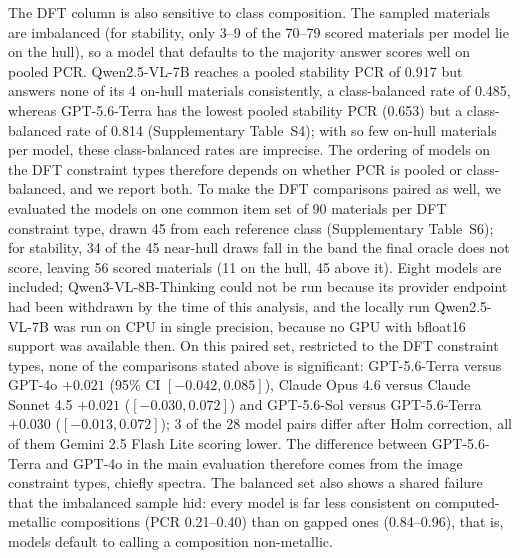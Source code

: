 \documentclass[pdflatex,sn-nature]{sn-jnl}
\newcommand{\rev}[1]{#1} %
\newcommand{\rev}[1]{{\color{blue}#1}} %
\providecommand{\DIFadd}[1]{{\protect\color{blue} \sf #1}} %
\providecommand{\DIFaddbegin}{} %
\providecommand{\DIFaddincludegraphics}[2][]{{\color{blue}\fbox{\DIFOincludegraphics[#1]{#2}}}} %
\DeclareRobustCommand{\DIFaddbegin}{\DIFOaddbegin \let\includegraphics\DIFaddincludegraphics} %
\begin{document}
\DIFaddbegin \DIFadd{\rev{The DFT column is also sensitive to class composition. The sampled materials are
imbalanced (for stability, only 3--9 of the 70--79 scored materials per model lie on the hull), so a
model that defaults to the majority answer scores well on pooled PCR. Qwen2.5-VL-7B reaches a pooled
stability PCR of 0.917 but answers none of its 4 on-hull materials consistently, a class-balanced rate
of 0.485, whereas GPT-5.6-Terra has the lowest pooled stability PCR (0.653) but a class-balanced rate of
0.814 (Supplementary Table~S4); with so few on-hull materials per model, these class-balanced rates are
imprecise. The ordering of models on the DFT constraint types therefore depends on whether PCR is pooled
or class-balanced, and we report both. To make the DFT comparisons paired as well, we evaluated the
models on one common item set of 90 materials per DFT constraint type, drawn 45 from each reference
class (Supplementary Table~S6); for stability, 34 of the 45 near-hull draws fall in the band the final
oracle does not score, leaving 56 scored materials (11 on the hull, 45 above it). Eight models are
included; Qwen3-VL-8B-Thinking could not be run because its provider endpoint had been withdrawn by the
time of this analysis, and the locally run Qwen2.5-VL-7B was run on CPU in single precision, because no
GPU with bfloat16 support was available then. On this paired set, restricted to the DFT constraint
types, none of the comparisons stated above is significant: GPT-5.6-Terra versus GPT-4o $+0.021$ (95\% CI
$[-0.042,0.085]$), Claude Opus 4.6 versus Claude Sonnet 4.5 $+0.021$ ($[-0.030,0.072]$) and GPT-5.6-Sol
versus GPT-5.6-Terra $+0.030$ ($[-0.013,0.072]$); 3 of the 28 model pairs differ after Holm correction,
all of them Gemini 2.5 Flash Lite scoring lower. The difference between GPT-5.6-Terra and GPT-4o in the
main evaluation therefore comes from the image constraint types, chiefly spectra. The balanced set also
shows a shared failure that the imbalanced sample hid: every model is far less consistent on
computed-metallic compositions (PCR 0.21--0.40) than on gapped ones (0.84--0.96), that is, models
default to calling a composition non-metallic.}
}
\end{document}

